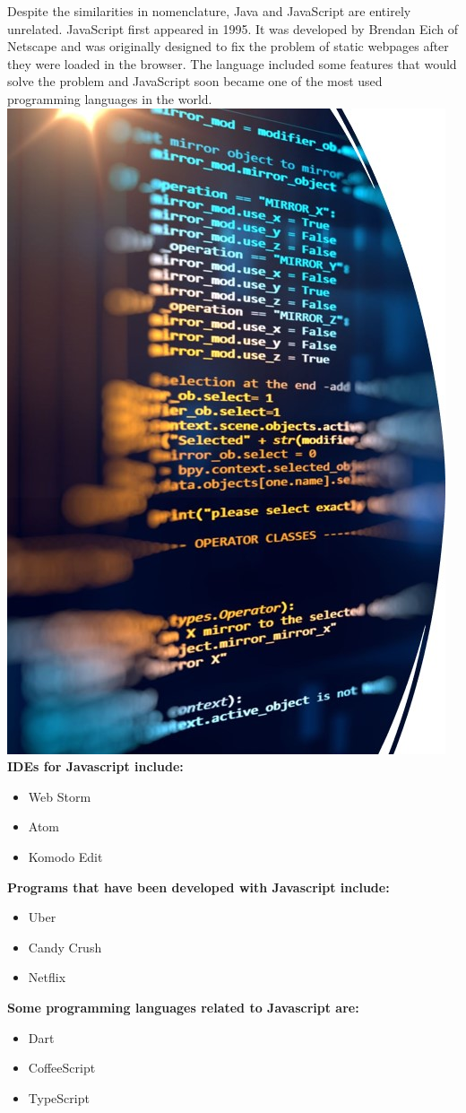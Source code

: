 \documentclass{article}
\begin{document}
Despite the similarities in nomenclature, Java and JavaScript are entirely unrelated. JavaScript first appeared in 1995. It was developed by Brendan Eich of Netscape and was originally designed to fix the problem of static webpages after they were loaded in the browser. The language included some features that would solve the problem and JavaScript soon became one of the most used programming languages in the world.
\\
\includegraphics[width=0.5\linewidth]{picture700}\\
\textbf{IDEs for Javascript include:}\\
\begin{itemize}
	\item Web Storm
	\item Atom
	\item Komodo Edit
\end{itemize}
\textbf{Programs that have been developed with Javascript include:}\\
\begin{itemize}
	\item Uber
	\item Candy Crush
	\item Netflix
\end{itemize}
\textbf{Some programming languages related to Javascript are:}\\
\begin{itemize}
	\item Dart
	\item CoffeeScript
	\item TypeScript
\end{itemize}
\end{document}
